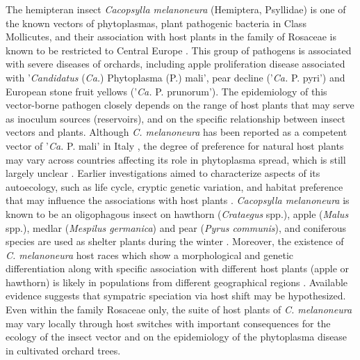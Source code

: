The hemipteran insect \textit{Cacopsylla melanoneura} (Hemiptera, Psyllidae) is one of the known vectors of phytoplasmas, plant pathogenic bacteria in Class Mollicutes, and their association with host plants in the family of Rosaceae is known to be restricted to Central Europe \citep{apple_proliferation_2020}. This group of pathogens is associated with severe diseases of orchards, including apple proliferation disease associated with '\textit{Candidatus} (\textit{Ca.}) Phytoplasma (P.) mali', pear decline ('\textit{Ca.} P. pyri') and European stone fruit yellows ('\textit{Ca.} P. prunorum'). The epidemiology of this vector-borne pathogen closely depends on the range of host plants that may serve as inoculum sources (reservoirs), and on the specific relationship between insect vectors and plants. Although \textit{C. melanoneura} has been reported as a competent vector of '\textit{Ca.} P. mali' in Italy \citep{tedeschi2002population}, the degree of preference for natural host plants may vary across countries affecting its role in phytoplasma spread, which is still largely unclear \citep{malagnini2010study}. Earlier investigations aimed to characterize aspects of its autoecology, such as life cycle, cryptic genetic variation, and habitat preference that may influence the associations with host plants \citep{malagnini2013ecological}.
\textit{Cacopsylla melanoneura} is known to be an oligophagous insect on hawthorn (\textit{Crataegus} spp.), apple (\textit{Malus} spp.), medlar (\textit{Mespilus germanica}) and pear (\textit{Pyrus communis}), and coniferous species are used as shelter plants during the winter \citep{jackson1990cold,lal1934biology,ossiannilsson1992psylloidea}. Moreover, the existence of \textit{C. melanoneura} host races which show a morphological and genetic differentiation along with specific association with different host plants (apple or hawthorn) is likely in populations from different geographical regions \citep{lazarev1972psylla,lazarev1974crimean,lauterer1999results,malagnini2013ecological}. Available evidence suggests that sympatric speciation via host shift may be hypothesized. Even within the family Rosaceae only, the suite of host plants of \textit{C. melanoneura} may vary locally through host switches with important consequences for the ecology of the insect vector and on the epidemiology of the phytoplasma disease in cultivated orchard trees.

